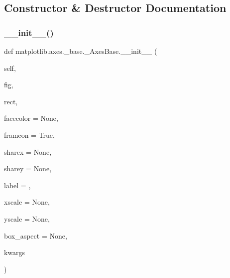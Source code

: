 \subsection{Constructor \& Destructor Documentation}
\mbox{\label{classmatplotlib_1_1axes_1_1__base_1_1__AxesBase_a9d2feb01e59eaa3fa8f0f791a99f596c}} 
\subsubsection{\texorpdfstring{\+\_\+\+\_\+init\+\_\+\+\_\+()}{\_\_init\_\_()}}
{\footnotesize\ttfamily def matplotlib.\+axes.\+\_\+base.\+\_\+\+Axes\+Base.\+\_\+\+\_\+init\+\_\+\+\_\+ (\begin{DoxyParamCaption}\item[{}]{self,  }\item[{}]{fig,  }\item[{}]{rect,  }\item[{}]{facecolor = {\ttfamily None},  }\item[{}]{frameon = {\ttfamily True},  }\item[{}]{sharex = {\ttfamily None},  }\item[{}]{sharey = {\ttfamily None},  }\item[{}]{label = {\ttfamily \textquotesingle{}\textquotesingle{}},  }\item[{}]{xscale = {\ttfamily None},  }\item[{}]{yscale = {\ttfamily None},  }\item[{}]{box\+\_\+aspect = {\ttfamily None},  }\item[{}]{kwargs }\end{DoxyParamCaption})}

